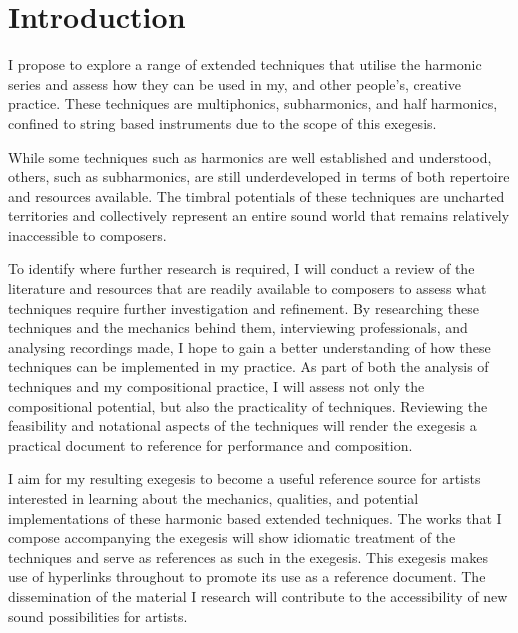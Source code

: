\section{Introduction}


\doublespace{}

I propose to explore a range of extended techniques that utilise the harmonic series and assess how they can be used in my, and other people's, creative practice. 
These techniques are multiphonics, subharmonics, and half harmonics, confined to string based instruments due to the scope of this exegesis.

While some techniques such as harmonics are well established and understood, others, such as subharmonics, are still underdeveloped in terms of both repertoire and resources available. 
The timbral potentials of these techniques are uncharted territories and collectively represent an entire sound world that remains relatively inaccessible to composers.

To identify where further research is required, I will conduct a review of the literature and resources that are readily available to composers to assess what techniques require further investigation and refinement. 
By researching these techniques and the mechanics behind them, interviewing professionals, and analysing recordings made, I hope to gain a better understanding of how these techniques can be implemented in my practice. 
As part of both the analysis of techniques and my compositional practice, I will assess not only the compositional potential, but also the practicality of techniques. 
Reviewing the feasibility and notational aspects of the techniques will render the exegesis a practical document to reference for performance and composition.

I aim for my resulting exegesis to become a useful reference source for artists interested in learning about the mechanics, qualities, and potential implementations of these harmonic based extended techniques. 
The works that I compose accompanying the exegesis will show idiomatic treatment of the techniques and serve as references as such in the exegesis.
This exegesis makes use of hyperlinks throughout to promote its use as a reference document. 
The dissemination of the material I research will contribute to the accessibility of new sound possibilities for artists.